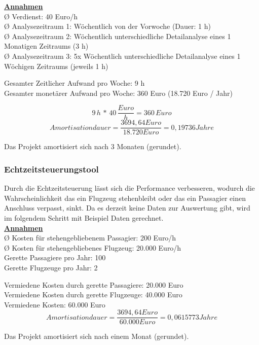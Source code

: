 	{
		\noindent
		\underline{\textbf{Annahmen}}\\
		Ø Verdienst: 40 Euro/h\\
		Ø Analysezeitraum 1: Wöchentlich von der Vorwoche (Dauer: 1 h)\\
		Ø Analysezeitraum 2: Wöchentlich unterschiedliche Detailanalyse eines 1 Monatigen Zeitraums (3 h)\\
		Ø Analysezeitraum 3: 5x Wöchentlich unterschiedliche Detailanalyse eines 1 Wöchigen Zeitraums (jeweils 1 h)\\

	}

	{
		\noindent
		Gesamter Zeitlicher Aufwand pro Woche: 9 h\\
		Gesamter monetärer Aufwand pro Woche: 360 Euro (18.720 Euro / Jahr)

		\[ 9\,h\,*\,40\,\frac{Euro}{h} = 360\,Euro \]
		\[ Amortisationdauer = \frac{3694,64 Euro}{18.720 Euro} = 0,19736 Jahre \]

		Das Projekt amortisiert sich nach 3 Monaten (gerundet).

	}

	
	\subsubsection{Echtzeitsteuerungstool}

	{
		Durch die Echtzeitsteuerung lässt sich die Performance verbesseren, wodurch die Wahrscheinlichkeit das ein Flugzeug stehenbleibt oder das ein Passagier einen Anschluss verpasst, sinkt. Da es derzeit keine Daten zur Auswertung gibt, wird im folgendem Schritt mit Beispiel Daten gerechnet.\\
		\noindent
		\underline{\textbf{Annahmen}}\\
		Ø Kosten für stehengebliebenem Passagier: 200 Euro/h\\
		Ø Kosten für stehengebliebenes Flugzeug: 20.000 Euro/h\\
		Gerette Passagiere pro Jahr: 100\\
		Gerette Flugzeuge pro Jahr: 2\\

	}

	{
		\noindent
		Vermiedene Kosten durch gerette Passagiere: 20.000 Euro\\
		Vermiedene Kosten durch gerette Flugzeuge: 40.000 Euro\\
		Vermiedene Kosten: 60.000 Euro\\

		\[ Amortisationdauer = \frac{3694,64 Euro}{60.000 Euro} = 0,0615773 Jahre \]

		Das Projekt amortisiert sich nach einem Monat (gerundet).

	}